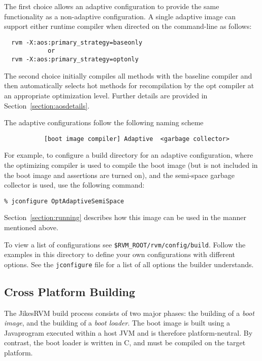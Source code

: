 The first choice allows an adaptive configuration to provide the same
functionality as a non-adaptive configuration.  A single adaptive
image can support either runtime compiler when directed on the
command-line as follows:
\begin{verbatim}
  rvm -X:aos:primary_strategy=baseonly
            or
  rvm -X:aos:primary_strategy=optonly
\end{verbatim}

The second choice initially compiles all methods with the
baseline compiler and then automatically selects hot methods for
recompilation by the opt compiler at an appropriate optimization
level. Further details are provided in Section~\ref{section:aosdetails}.

The adaptive configurations follow the following naming scheme
\begin{verbatim}
           [boot image compiler] Adaptive  <garbage collector>
\end{verbatim}

For example, to configure a build 
directory for an adaptive configuration, where the optimizing compiler is 
used to compile the boot image (but is not included in the boot image
and assertions are turned on), and the semi-space garbage collector is
used, use the following command:

\begin{verbatim}
% jconfigure OptAdaptiveSemiSpace
\end{verbatim}

Section~\ref{section:running} describes how this image can be used in
the manner mentioned above.

To view a list of configurations see 
{\tt \$RVM\_ROOT/rvm/config/build}.  Follow the examples in this
directory to define your own configurations with different options.  See
the {\tt jconfigure} file for a list of all options the builder
understands.

\JikesTMFooter

\subsection{Cross Platform Building}

The Jikes\trademark RVM build process consists of two major phases:
the building of a 
{\em boot image}, and the building of a {\em boot loader}.
The boot image is built using a Java\trademark program executed within a host
JVM and is therefore platform-neutral.  By contrast, the boot loader
is written in C, and must be compiled on the target platform.

